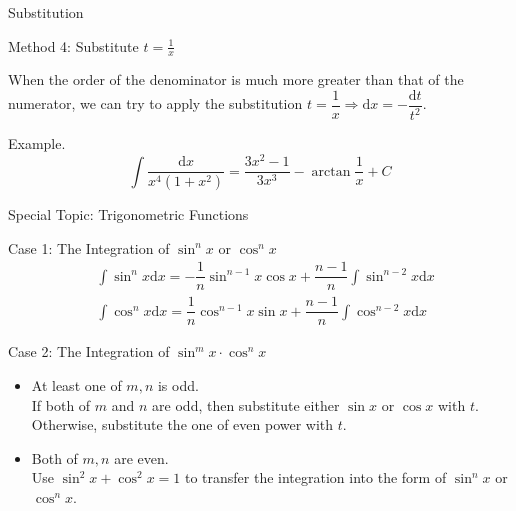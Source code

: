\documentclass[aspectratio=169, UTF8]{ctexbeamer}
\begin{document}
    \begin{frame}[t]{Substitution}
        \begin{block}{Method 4: Substitute $t = \frac{1}{x}$}
            \par When the order of the denominator is much more greater than that of the numerator, we can try to apply the substitution $t = \dfrac{1}{x} \Rightarrow \mathrm{d}x = - \dfrac{\mathrm{d}t}{t^2}$.
        \end{block}
        \par \textcolor{yy}{Example.} $$\int \dfrac{\mathrm{d}x}{x^{4}\left(1+x^{2}\right)} =\dfrac{3 x^{2}-1}{3 x^{3}}-\arctan \dfrac{1}{x}+C$$
    \end{frame}

    \begin{frame}[t]{Special Topic: Trigonometric Functions}
        \begin{block}{Case 1: The Integration of $\sin^n x$ or $\cos^nx$}
        \begin{equation*}
            \begin{aligned}
                & \int \sin ^{n} x \mathrm{d} x=-\dfrac{1}{n} \sin ^{n-1} x \cos x+\dfrac{n-1}{n} \int \sin ^{n-2} x \mathrm{d} x \\
                & \int \cos ^{n} x \mathrm{d} x=\dfrac{1}{n} \cos ^{n-1} x \sin x+\dfrac{n-1}{n} \int \cos ^{n-2} x \mathrm{d} x
            \end{aligned}
        \end{equation*}
        \end{block}

        \begin{block}{Case 2: The Integration of $\sin^mx\cdot\cos^nx$}
            \begin{itemize}
                \item At least one of $m,n$ is {odd}.\\
                    If both of $m$ and $n$ are odd, then substitute either $\sin x$ or $\cos x$ with $t$. Otherwise, substitute the one of even power with $t$.
                \item Both of $m,n$ are {even}.\\
                    Use $\sin^2 x+\cos^2 x=1$ to transfer the integration into the form of $\sin^n x$ or $\cos^n x$.
            \end{itemize}
        \end{block}
    \end{frame}
\end{document}
